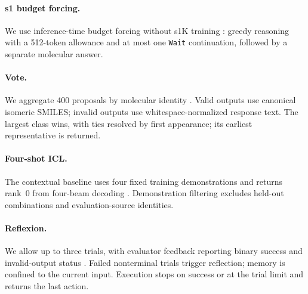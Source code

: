 \paragraph{s1 budget forcing.}
We use inference-time budget forcing without s1K training \citep{s1_2025}: greedy reasoning with a 512-token allowance and at most one \texttt{Wait} continuation, followed by a separate molecular answer.

\paragraph{Vote.}
We aggregate 400 proposals by molecular identity \citep{voting2024}. Valid outputs use canonical isomeric SMILES; invalid outputs use whitespace-normalized response text. The largest class wins, with ties resolved by first appearance; its earliest representative is returned.

\paragraph{Four-shot ICL.}
The contextual baseline uses four fixed training demonstrations and returns rank~0 from four-beam decoding \citep{brown2020}. Demonstration filtering excludes held-out combinations and evaluation-source identities.

\paragraph{Reflexion.}
We allow up to three trials, with evaluator feedback reporting binary success and invalid-output status \citep{reflexion2023}. Failed nonterminal trials trigger reflection; memory is confined to the current input. Execution stops on success or at the trial limit and returns the last action.
